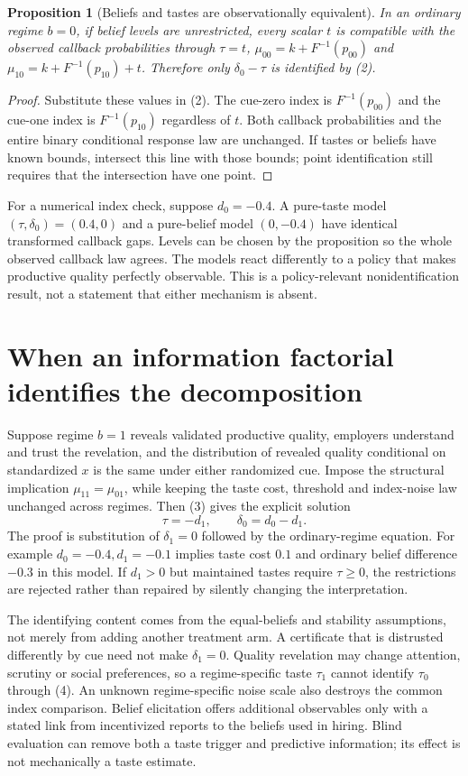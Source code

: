 \documentclass[11pt,a4paper]{article}
\newtheorem{proposition}[theorem]{Proposition}
\begin{document}
\begin{proposition}[Beliefs and tastes are observationally equivalent]
In an ordinary regime $b=0$, if belief levels are unrestricted, every scalar $t$ is compatible with the observed callback probabilities through $\tau=t$, $\mu_{00}=k+F^{-1}(p_{00})$ and $\mu_{10}=k+F^{-1}(p_{10})+t$. Therefore only $\delta_0-\tau$ is identified by (2).
\end{proposition}
\begin{proof}
Substitute these values in (2). The cue-zero index is $F^{-1}(p_{00})$ and the cue-one index is $F^{-1}(p_{10})$ regardless of $t$. Both callback probabilities and the entire binary conditional response law are unchanged. If tastes or beliefs have known bounds, intersect this line with those bounds; point identification still requires that the intersection have one point.
\end{proof}

For a numerical index check, suppose $d_0=-0.4$. A pure-taste model $(\tau,\delta_0)=(0.4,0)$ and a pure-belief model $(0,-0.4)$ have identical transformed callback gaps. Levels can be chosen by the proposition so the whole observed callback law agrees. The models react differently to a policy that makes productive quality perfectly observable. This is a policy-relevant nonidentification result, not a statement that either mechanism is absent.

\section{When an information factorial identifies the decomposition}
Suppose regime $b=1$ reveals validated productive quality, employers understand and trust the revelation, and the distribution of revealed quality conditional on standardized $x$ is the same under either randomized cue. Impose the structural implication $\mu_{11}=\mu_{01}$, while keeping the taste cost, threshold and index-noise law unchanged across regimes. Then (3) gives the explicit solution
\[
 \tau=-d_1,\qquad \delta_0=d_0-d_1.                  \tag{4}
\]
The proof is substitution of $\delta_1=0$ followed by the ordinary-regime equation. For example $d_0=-0.4,d_1=-0.1$ implies taste cost $0.1$ and ordinary belief difference $-0.3$ in this model. If $d_1>0$ but maintained tastes require $\tau\ge0$, the restrictions are rejected rather than repaired by silently changing the interpretation.

The identifying content comes from the equal-beliefs and stability assumptions, not merely from adding another treatment arm. A certificate that is distrusted differently by cue need not make $\delta_1=0$. Quality revelation may change attention, scrutiny or social preferences, so a regime-specific taste $\tau_1$ cannot identify $\tau_0$ through (4). An unknown regime-specific noise scale also destroys the common index comparison. Belief elicitation offers additional observables only with a stated link from incentivized reports to the beliefs used in hiring. Blind evaluation can remove both a taste trigger and predictive information; its effect is not mechanically a taste estimate.
\end{document}
